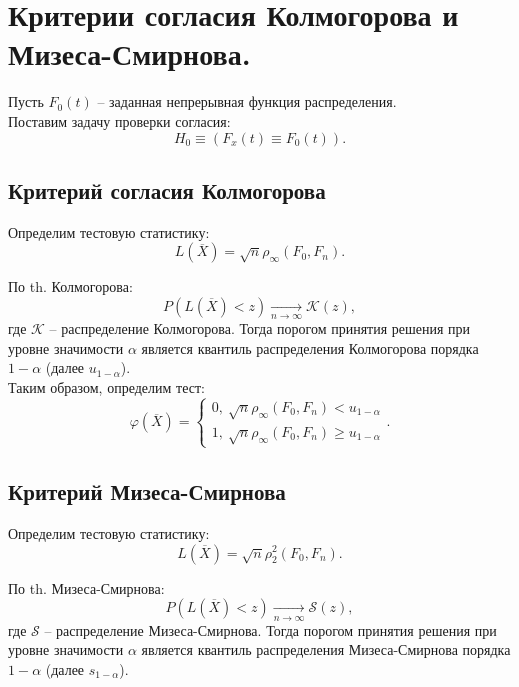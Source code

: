\section{Критерии согласия Колмогорова и Мизеса-Смирнова.}

Пусть $F_0(t)$ -- заданная непрерывная функция распределения.\\

Поставим задачу проверки согласия:
\[
  H_0 \equiv (F_x(t) \equiv F_0(t))
.\]

\subsection{Критерий согласия Колмогорова}

Определим тестовую статистику:
\[
  L(\overline{X}) = \sqrt{n} \rho_{\infty}(F_0, F_n)
.\]

По th. Колмогорова:
\[
  P(L(\overline{X}) < z) \xrightarrow[n \to \infty]{} \mathcal{K}(z)
,\]
где $\mathcal{K}$ -- распределение Колмогорова.
Тогда порогом принятия решения при уровне значимости $\alpha$ является
квантиль распределения Колмогорова порядка $1 - \alpha$
(далее $u_{1 - \alpha}$).\\

Таким образом, определим тест:
\[
  \varphi(\overline{X}) = \begin{cases}
    0,~ \sqrt{n} \rho_{\infty}(F_0, F_n) < u_{1 - \alpha}\\
    1,~ \sqrt{n} \rho_{\infty}(F_0, F_n) \geqslant u_{1 - \alpha}
  \end{cases}
.\]

\subsection{Критерий Мизеса-Смирнова}

Определим тестовую статистику:
\[
  L(\overline{X}) = \sqrt{n} \rho_{2}^{2}(F_0, F_n)
.\]

По th. Мизеса-Смирнова:
\[
  P(L(\overline{X}) < z) \xrightarrow[n \to \infty]{} \mathcal{S}(z)
,\]
где $\mathcal{S}$ -- распределение Мизеса-Смирнова.
Тогда порогом принятия решения при уровне значимости $\alpha$ является
квантиль распределения Мизеса-Смирнова порядка $1 - \alpha$
(далее $s_{1 - \alpha}$).\\


